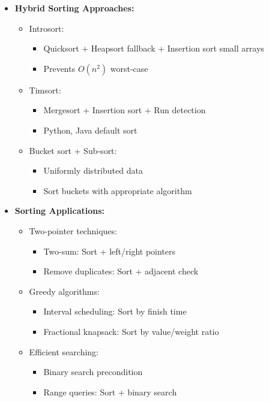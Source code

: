 \documentclass[a4paper,10pt]{book}
\begin{document}
\begin{itemize}
    \item \textbf{Hybrid Sorting Approaches:}
    \begin{itemize}
        \item Introsort:
        \begin{itemize}
            \item Quicksort + Heapsort fallback + Insertion sort small arrays
            \item Prevents $O(n^2)$ worst-case
        \end{itemize}
        \item Timsort:
        \begin{itemize}
            \item Mergesort + Insertion sort + Run detection
            \item Python, Java default sort
        \end{itemize}
        \item Bucket sort + Sub-sort:
        \begin{itemize}
            \item Uniformly distributed data
            \item Sort buckets with appropriate algorithm
        \end{itemize}
    \end{itemize}
    
    \item \textbf{Sorting Applications:}
    \begin{itemize}
        \item Two-pointer techniques:
        \begin{itemize}
            \item Two-sum: Sort + left/right pointers
            \item Remove duplicates: Sort + adjacent check
        \end{itemize}
        \item Greedy algorithms:
        \begin{itemize}
            \item Interval scheduling: Sort by finish time
            \item Fractional knapsack: Sort by value/weight ratio
        \end{itemize}
        \item Efficient searching:
        \begin{itemize}
            \item Binary search precondition
            \item Range queries: Sort + binary search
        \end{itemize}
    \end{itemize}
    

\end{itemize}
\end{document}
